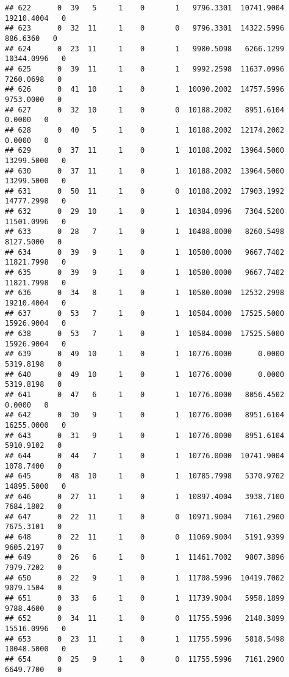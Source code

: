 \documentclass[
]{article}
\begin{document}
\begin{enumerate}
\begin{verbatim}
## 622      0  39   5     1    0       1   9796.3301  10741.9004  19210.4004   0
## 623      0  32  11     1    0       0   9796.3301  14322.5996    886.6360   0
## 624      0  23  11     1    0       1   9980.5098   6266.1299  10344.0996   0
## 625      0  39  11     1    0       1   9992.2598  11637.0996   7260.0698   0
## 626      0  41  10     1    0       1  10090.2002  14757.5996   9753.0000   0
## 627      0  32  10     1    0       0  10188.2002   8951.6104      0.0000   0
## 628      0  40   5     1    0       1  10188.2002  12174.2002      0.0000   0
## 629      0  37  11     1    0       1  10188.2002  13964.5000  13299.5000   0
## 630      0  37  11     1    0       1  10188.2002  13964.5000  13299.5000   0
## 631      0  50  11     1    0       0  10188.2002  17903.1992  14777.2998   0
## 632      0  29  10     1    0       1  10384.0996   7304.5200  11501.0996   0
## 633      0  28   7     1    0       1  10488.0000   8260.5498   8127.5000   0
## 634      0  39   9     1    0       1  10580.0000   9667.7402  11821.7998   0
## 635      0  39   9     1    0       1  10580.0000   9667.7402  11821.7998   0
## 636      0  34   8     1    0       1  10580.0000  12532.2998  19210.4004   0
## 637      0  53   7     1    0       1  10584.0000  17525.5000  15926.9004   0
## 638      0  53   7     1    0       1  10584.0000  17525.5000  15926.9004   0
## 639      0  49  10     1    0       1  10776.0000      0.0000   5319.8198   0
## 640      0  49  10     1    0       1  10776.0000      0.0000   5319.8198   0
## 641      0  47   6     1    0       1  10776.0000   8056.4502      0.0000   0
## 642      0  30   9     1    0       1  10776.0000   8951.6104  16255.0000   0
## 643      0  31   9     1    0       1  10776.0000   8951.6104   5910.9102   0
## 644      0  44   7     1    0       1  10776.0000  10741.9004   1078.7400   0
## 645      0  48  10     1    0       1  10785.7998   5370.9702  14895.5000   0
## 646      0  27  11     1    0       1  10897.4004   3938.7100   7684.1802   0
## 647      0  22  11     1    0       0  10971.9004   7161.2900   7675.3101   0
## 648      0  22  11     1    0       0  11069.9004   5191.9399   9605.2197   0
## 649      0  26   6     1    0       1  11461.7002   9807.3896   7979.7202   0
## 650      0  22   9     1    0       1  11708.5996  10419.7002   9079.1504   0
## 651      0  33   6     1    0       1  11739.9004   5958.1899   9788.4600   0
## 652      0  34  11     1    0       0  11755.5996   2148.3899  15516.0996   0
## 653      0  23  11     1    0       1  11755.5996   5818.5498  10048.5000   0
## 654      0  25   9     1    0       0  11755.5996   7161.2900   6649.7700   0

\end{verbatim}
\end{enumerate}
\end{document}
